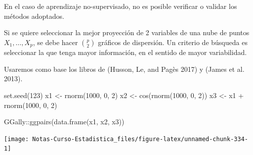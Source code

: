 \documentclass[
  12pt,
]{book}
\newenvironment{Shaded}{\begin{snugshade}}{\end{snugshade}}
\newcommand{\AttributeTok}[1]{\textcolor[rgb]{0.77,0.63,0.00}{#1}}
\newcommand{\DecValTok}[1]{\textcolor[rgb]{0.00,0.00,0.81}{#1}}
\newcommand{\FunctionTok}[1]{\textcolor[rgb]{0.00,0.00,0.00}{#1}}
\newcommand{\NormalTok}[1]{#1}
\newcommand{\OtherTok}[1]{\textcolor[rgb]{0.56,0.35,0.01}{#1}}
\newcommand{\SpecialCharTok}[1]{\textcolor[rgb]{0.00,0.00,0.00}{#1}}
\newcommand{\StringTok}[1]{\textcolor[rgb]{0.31,0.60,0.02}{#1}}
\begin{document}
En el caso de aprendizaje no-supervisado, no es posible verificar o
validar los métodos adoptados.

Si se quiere seleccionar la mejor proyección de 2 variables de una nube
de puntos \(X_1,\dots, X_p\), se debe hacer \(\binom{p}{2}\) gráficos de
dispersión. Un criterio de búsqueda es seleccionar la que tenga mayor
información, en el sentido de mayor variabilidad.

Usaremos como base los libros de (Husson, Le, and Pagès 2017) y (James
et al. 2013).

\begin{Shaded}
\end{Shaded}

\begin{Shaded}
\begin{Highlighting}[]
\FunctionTok{set.seed}\NormalTok{(}\DecValTok{123}\NormalTok{)}
\NormalTok{x1 }\OtherTok{\textless{}{-}} \FunctionTok{rnorm}\NormalTok{(}\DecValTok{1000}\NormalTok{, }\DecValTok{0}\NormalTok{, }\DecValTok{2}\NormalTok{)}
\NormalTok{x2 }\OtherTok{\textless{}{-}} \FunctionTok{cos}\NormalTok{(}\FunctionTok{rnorm}\NormalTok{(}\DecValTok{1000}\NormalTok{, }\DecValTok{0}\NormalTok{, }\DecValTok{2}\NormalTok{))}
\NormalTok{x3 }\OtherTok{\textless{}{-}}\NormalTok{ x1 }\SpecialCharTok{+} \FunctionTok{rnorm}\NormalTok{(}\DecValTok{1000}\NormalTok{, }\DecValTok{0}\NormalTok{, }\DecValTok{2}\NormalTok{)}
\end{Highlighting}
\end{Shaded}

\begin{Shaded}
\begin{Highlighting}[]
\NormalTok{GGally}\SpecialCharTok{::}\FunctionTok{ggpairs}\NormalTok{(}\FunctionTok{data.frame}\NormalTok{(x1, x2, x3))}
\end{Highlighting}
\end{Shaded}

\begin{center}\texttt{[image: Notas-Curso-Estadistica\_files/figure-latex/unnamed-chunk-334-1]} \end{center}
\end{document}
